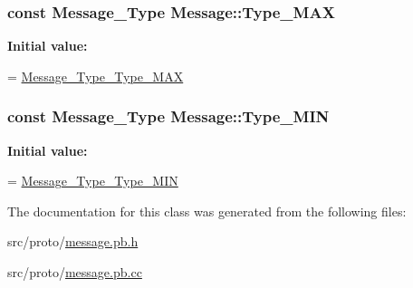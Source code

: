 \subsubsection[{\texorpdfstring{Type\+\_\+\+M\+AX}{Type_MAX}}]{\setlength{\rightskip}{0pt plus 5cm}const {\bf Message\+\_\+\+Type} Message\+::\+Type\+\_\+\+M\+AX\hspace{0.3cm}{\ttfamily [static]}}\hypertarget{class_message_aad308e35392d6a12f366c39c06d4dd92}{}\label{class_message_aad308e35392d6a12f366c39c06d4dd92}
{\bfseries Initial value\+:}
\begin{DoxyCode}
=
    \hyperlink{message_8pb_8h_af22d92487ccd5d41b9d4cb8cc7896ded}{Message\_Type\_Type\_MAX}
\end{DoxyCode}
\subsubsection[{\texorpdfstring{Type\+\_\+\+M\+IN}{Type_MIN}}]{\setlength{\rightskip}{0pt plus 5cm}const {\bf Message\+\_\+\+Type} Message\+::\+Type\+\_\+\+M\+IN\hspace{0.3cm}{\ttfamily [static]}}\hypertarget{class_message_a9fc82f92e8d5c8d07f77e60d057a4077}{}\label{class_message_a9fc82f92e8d5c8d07f77e60d057a4077}
{\bfseries Initial value\+:}
\begin{DoxyCode}
=
    \hyperlink{message_8pb_8h_a8894bdaf08226955480cbd6198dac18d}{Message\_Type\_Type\_MIN}
\end{DoxyCode}


The documentation for this class was generated from the following files\+:\begin{DoxyCompactItemize}
\item 
src/proto/\hyperlink{message_8pb_8h}{message.\+pb.\+h}\item 
src/proto/\hyperlink{message_8pb_8cc}{message.\+pb.\+cc}\end{DoxyCompactItemize}
